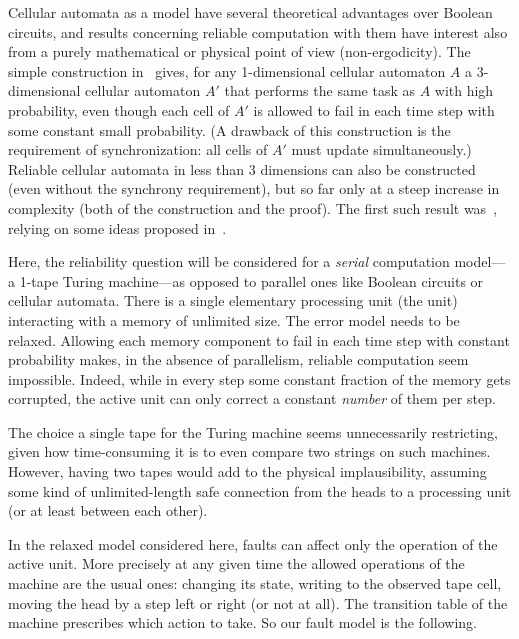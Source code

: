 \documentclass[11pt]{memoir}
\theoremstyle{definition} %
\begin{document}
Cellular automata as a model have several theoretical advantages over
Boolean circuits, and results concerning
reliable computation with them have interest also from a purely mathematical or 
physical point of view (non-ergodicity).
The simple construction in~\cite{GacsReif3dim88} gives, for any 1-dimensional
cellular automaton \( A \) a 3-dimensional cellular automaton \( A' \) 
that performs the same task as \( A \) with high probability, even though each cell of
\( A' \) is allowed to fail in each time step with some constant small probability.
(A drawback of this construction is the requirement of synchronization: all cells of \( A' \) must
update simultaneously.)
Reliable cellular automata in less than 3 dimensions can also be constructed (even
without the synchrony requirement), but so far only at a
steep increase in complexity (both of the construction and the proof).
The first such result was~\cite{Gacs1dim86}, relying on some ideas proposed in~\cite{Kurd78}.

Here, the reliability question will be considered for a \emph{serial}
computation model---a 1-tape Turing machine---as opposed to parallel ones like
Boolean circuits or cellular automata.
There is a single elementary processing unit (the  unit)
interacting with a memory of unlimited size.
The error model needs to be relaxed.
Allowing each memory component to fail in each time step with constant probability
makes, in the absence of parallelism, reliable computation seem impossible.
Indeed, while in every step some constant fraction of the memory gets corrupted,
the active unit can only correct a constant \emph{number} of them per step.

\begin{remark}
  The choice a single tape for the Turing machine seems unnecessarily restricting,
  given how time-consuming it is to even compare two strings on such machines.
  However, having two tapes would add to the physical implausibility, assuming
  some kind of unlimited-length safe connection from the heads to a 
  processing unit (or at least between each other).
\end{remark}

In the relaxed model considered here, faults can affect only the operation of the active unit.
More precisely at any given time the allowed operations of the machine are the usual ones:
changing its state, writing to the observed tape cell, moving the head by a step left or right (or not at all).
The transition table of the machine prescribes which action to take.
So our fault model is the following.
\end{document}
